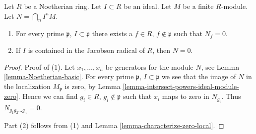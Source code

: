 \begin{lemma}
\label{lemma-intersection-powers-ideal-module}
Let $R$ be a Noetherian ring. Let $I \subset R$ be an ideal.
Let $M$ be a finite $R$-module. Let $N = \bigcap_n I^n M$.
\begin{enumerate}
\item For every prime $\mathfrak p$, $I \subset \mathfrak p$ there
exists a $f \in R$, $f \not \in \mathfrak p$ such that $N_f = 0$.
\item If $I$ is contained in the Jacobson radical
of $R$, then $N = 0$.
\end{enumerate}
\end{lemma}

\begin{proof}
Proof of (1). Let $x_1, \ldots, x_n$ be generators for the module $N$,
see Lemma \ref{lemma-Noetherian-basic}. For every prime
$\mathfrak p$, $I \subset \mathfrak p$ we see that
the image of $N$ in the localization $M_{\mathfrak p}$
is zero, by Lemma \ref{lemma-intersect-powers-ideal-module-zero}.
Hence we can find $g_i \in R$, $g_i \not \in \mathfrak p$
such that $x_i$ maps to zero in $N_{g_i}$. Thus
$N_{g_1g_2\ldots g_n} = 0$.

\medskip\noindent
Part (2) follows from (1) and Lemma \ref{lemma-characterize-zero-local}.
\end{proof}